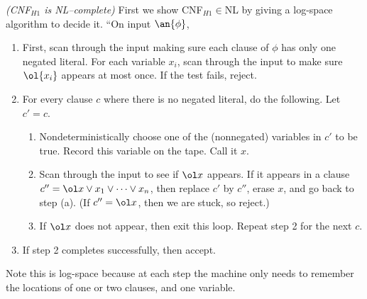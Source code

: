 \pagebreak

\begin{problem}{\it(CNF${}_{H1}$ is NL--complete)}
First we show CNF${}_{H1}\in$NL %
by giving a log-space algorithm to decide it. ``On input $\an{\phi}$,
\begin{enumerate}
\item
First, scan through the input making sure each clause of $\phi$ has only one negated literal. For each variable $x_i$, scan through the input to make sure $\ol{x_i}$ appears at most once. If the test fails, reject.
\item
For every clause $c$ where there is no negated literal, do the following.
Let $c'=c$.
\begin{enumerate}
\item
Nondeterministically choose one of the (nonnegated) variables in $c'$ to be true. Record this variable on the tape. Call it $x$.
\item Scan through the input to see if $\ol x$ appears. If it appears in a clause $c''=\ol x\vee x_1\vee \cdots \vee x_n$, then replace $c'$ by $c''$, erase $x$, and go back to step (a). (If $c''=\ol x$, then we are stuck, so reject.)
\item If $\ol x$ does not appear, then exit this loop. Repeat step 2 for the next $c$.
\end{enumerate}
\item If step 2 completes successfully, then accept.
\end{enumerate}
Note this is log-space because at each step the machine only needs to remember the locations of one or two clauses, and one variable. 


\end{problem}
